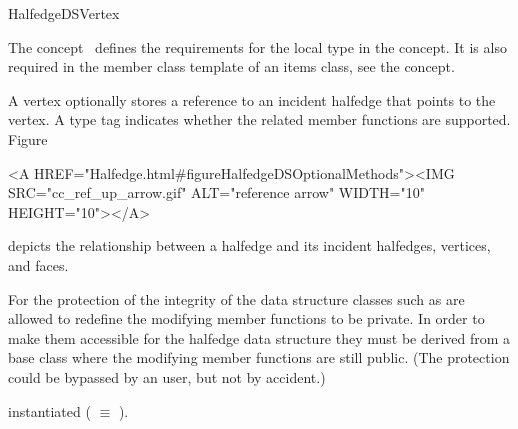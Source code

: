 
\ccRefPageBegin



\begin{ccRefConcept}{HalfedgeDSVertex}
\label{pageHalfedgeDSItemsVertexRef}

\ccDefinition
  
The concept \ccRefName\ defines the requirements for the local  
type in the  concept. It is also required in 
the  member class template of an
items class, see the  concept.

A vertex optionally stores a reference to an incident halfedge that
points to the vertex. A type tag indicates whether the related member
functions are supported. 
Figure~\begin{ccHtmlOnly}
  <A HREF="Halfedge.html#figureHalfedgeDSOptionalMethods"><IMG 
  SRC="cc_ref_up_arrow.gif" ALT="reference arrow" WIDTH="10" HEIGHT="10"></A>
\end{ccHtmlOnly}
depicts the relationship between a halfedge and its incident
halfedges, vertices, and faces.

For the protection of the integrity of the data structure classes such as
 are allowed to redefine the modifying member 
functions to be private. In order to make them accessible for the 
halfedge data structure they must be derived from a base class 
where the modifying member functions are still public. (The protection 
could be bypassed by an user, but not by accident.)

\ccTypes
{}
\ccThreeToTwo

    {instantiated  ( $\equiv$ ).}
\ccGlue
{}
\ccGlue
{}
\ccGlue
{}
\ccGlue
{}
\ccGlue
{}
\ccGlue
{}
\ccGlue
{}
\ccGlue
{}
\ccGlue
{}
\ccGlue
{}


\end{ccRefConcept}
